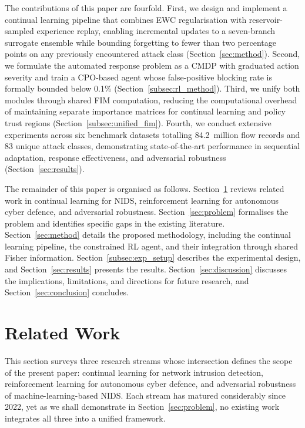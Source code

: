 \documentclass[journal]{IEEEtran}
\theoremstyle{definition}
\theoremstyle{remark}
\begin{document}
The contributions of this paper are fourfold. First, we design and implement a continual learning pipeline that combines EWC regularisation with reservoir-sampled experience replay, enabling incremental updates to a seven-branch surrogate ensemble while bounding forgetting to fewer than two percentage points on any previously encountered attack class (Section~\ref{sec:method}). Second, we formulate the automated response problem as a CMDP with graduated action severity and train a CPO-based agent whose false-positive blocking rate is formally bounded below 0.1\% (Section~\ref{subsec:rl_method}). Third, we unify both modules through shared FIM computation, reducing the computational overhead of maintaining separate importance matrices for continual learning and policy trust regions (Section~\ref{subsec:unified_fim}). Fourth, we conduct extensive experiments across six benchmark datasets totalling 84.2~million flow records and 83 unique attack classes, demonstrating state-of-the-art performance in sequential adaptation, response effectiveness, and adversarial robustness (Section~\ref{sec:results}).

The remainder of this paper is organised as follows. Section~\ref{sec:related} reviews related work in continual learning for NIDS, reinforcement learning for autonomous cyber defence, and adversarial robustness. Section~\ref{sec:problem} formalises the problem and identifies specific gaps in the existing literature. Section~\ref{sec:method} details the proposed methodology, including the continual learning pipeline, the constrained RL agent, and their integration through shared Fisher information. Section~\ref{subsec:exp_setup} describes the experimental design, and Section~\ref{sec:results} presents the results. Section~\ref{sec:discussion} discusses the implications, limitations, and directions for future research, and Section~\ref{sec:conclusion} concludes.

\section{Related Work}
\label{sec:related}

This section surveys three research streams whose intersection defines the scope of the present paper: continual learning for network intrusion detection, reinforcement learning for autonomous cyber defence, and adversarial robustness of machine-learning-based NIDS. Each stream has matured considerably since 2022, yet as we shall demonstrate in Section~\ref{sec:problem}, no existing work integrates all three into a unified framework.
\end{document}
